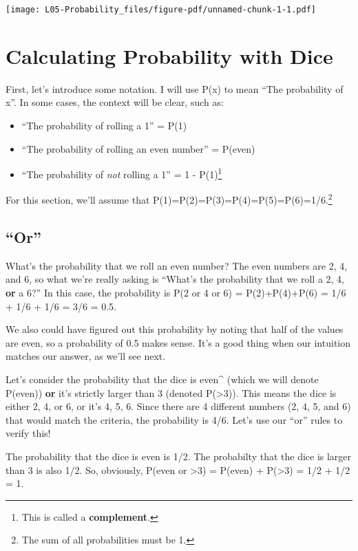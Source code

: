 \documentclass[
  letterpaper,
  DIV=11,
  numbers=noendperiod]{scrreprt}
\providecommand{\tightlist}{%
  \setlength{\itemsep}{0pt}\setlength{\parskip}{0pt}}\usepackage{longtable,booktabs,array}
\begin{document}
\texttt{[image: L05-Probability\_files/figure-pdf/unnamed-chunk-1-1.pdf]}

\hypertarget{calculating-probability-with-dice}{%
\chapter{Calculating Probability with
Dice}\label{calculating-probability-with-dice}}

First, let's introduce some notation. I will use P(x) to mean ``The
probability of x''. In some cases, the context will be clear, such as:

\begin{itemize}
\tightlist
\item
  ``The probability of rolling a 1'' = P(1)
\item
  ``The probability of rolling an even number'' = P(even)
\item
  ``The probability of \emph{not} rolling a 1'' = 1 - P(1)\footnote{This
    is called a \textbf{complement}.}
\end{itemize}

For this section, we'll assume that
P(1)=P(2)=P(3)=P(4)=P(5)=P(6)=1/6.\footnote{The sum of all probabilities
  must be 1.}

\hypertarget{or}{%
\section{``Or''}\label{or}}

What's the probability that we roll an even number? The even numbers are
2, 4, and 6, so what we're really asking is ``What's the probability
that we roll a 2, 4, \textbf{or} a 6?'' In this case, the probability is
P(2 or 4 or 6) = P(2)+P(4)+P(6) = 1/6 + 1/6 + 1/6 = 3/6 = 0.5.

We also could have figured out this probability by noting that half of
the values are even, so a probability of 0.5 makes sense. It's a good
thing when our intuition matches our answer, as we'll see next.

Let's consider the probability that the dice is even\^{} (which we will
denote P(even)) \textbf{or} it's strictly larger than 3 (denoted
P(\textgreater3)). This means the dice is either 2, 4, or 6, or it's 4,
5, 6. Since there are 4 different numbers (2, 4, 5, and 6) that would
match the criteria, the probability is 4/6. Let's use our ``or'' rules
to verify this!

The probability that the dice is even is 1/2. The probabilty that the
dice is larger than 3 is also 1/2. So, obviously, P(even or
\textgreater3) = P(even) + P(\textgreater3) = 1/2 + 1/2 = 1.
\end{document}
